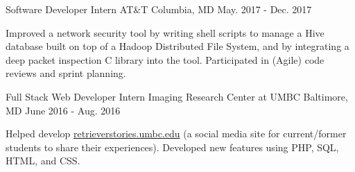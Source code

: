 \begin{cventries}
  \cventry
    {Software Developer Intern} %
    {AT\&T} %
    {Columbia, MD} %
    {May. 2017 - Dec. 2017} %
    {
      \begin{cvitems} %
        \item {Improved a network security tool by writing shell scripts to manage a Hive database built on 
top of a Hadoop Distributed File System, and by integrating a deep packet inspection C 
library into the tool.  Participated in (Agile) code reviews and sprint planning.}
      \end{cvitems}
    }

  \cventry
    {Full Stack Web Developer Intern} %
    {Imaging Research Center at UMBC} %
    {Baltimore, MD} %
    {June 2016 - Aug. 2016} %
    {
      \begin{cvitems} %
      \item {Helped develop \href{https://retrieverstories.umbc.edu}{retrieverstories.umbc.edu} (a social media site for current/former students to 
share their experiences).  Developed new features using PHP, SQL, HTML, and CSS. }
      \end{cvitems}
    }

\end{cventries}
